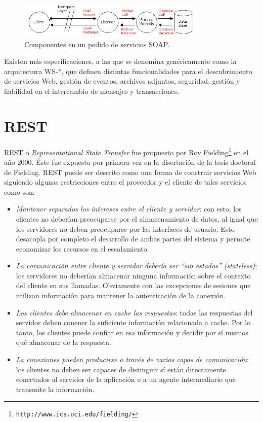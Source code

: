 \documentclass[conference]{IEEEtran}
\begin{document}
\begin{figure}[!t]
\centering
  \includegraphics[width=0.8\textwidth]{img/soap-comp}
  \caption{Componentes en un pedido de servicios SOAP.}
  \label{fig:soap-comp}
\end{figure}

Existen más especificaciones, a las que se denomina genéricamente como
la arquitectura WS-*, que definen distintas funcionalidades para el
descubrimiento de servicios Web, gestión de eventos, archivos
adjuntos, seguridad, gestión y fiabilidad en el intercambio de
mensajes y transacciones. 

\section{REST}
\label{sec:soap}

REST o \textsl{Representational State Transfer} fue propuesto por Roy
Fielding\footnote{\texttt{http://www.ics.uci.edu/\texttildelow fielding/}} en el
año 2000. Éste fue expuesto por primera vez en la disertación
de la tesis doctoral de Fielding. REST
puede ser descrito como una forma de construir servicios Web siguiendo
algunas restricciones entre el proveedor y el cliente de tales
servicios como son\cite{NordicAPIs}:

\begin{itemize}
\item \emph{Mantener separados los intereses entre el cliente y
    servidor}: con esto, los clientes no deberían preocuparse por el
  almacenamiento de datos, al igual que los servidores no deben
  preocuparse por las interfaces de usuario. Esto desacopla por completo
  el desarrollo de ambas partes del sistema y permite economizar los
  recursos en el escalamiento.
\item \emph{La comunicación entre cliente y servidor debería ser ``sin
    estados'' (stateless)}: los servidores no deberían almacenar ninguna
  información sobre el contexto del cliente en sus llamadas. Obviamente
  con las excepciones de sesiones que utilizan información para mantener
  la autenticación de la conexión.
\item \emph{Los clientes debe almacenar en cache las respuestas}:
  todas las respuestas del servidor deben conener la suficiente
  información relacionada a cache. Por lo tanto, los clientes puede
  confiar en esa información y decidir por sí mismos qué almacenar de la
  respuesta.
\item \emph{La conexiones pueden producirse a través de varias capas
    de comunicación}: los clientes no deben ser capaces de distinguir sí
  están directamente conectados al servidor de la aplicación o a un
  agente intermediario que transmite la información.
\end{itemize}
\end{document}
